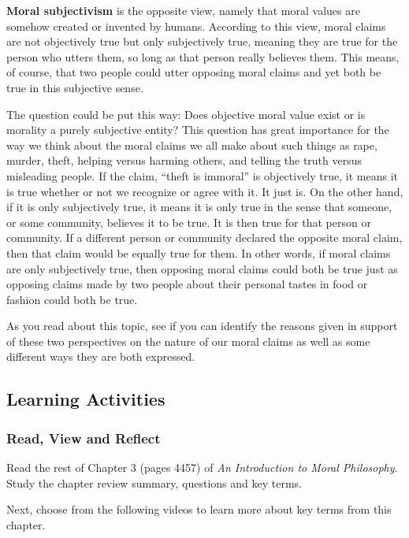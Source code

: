 \documentclass[
]{book}
\begin{document}
\textbf{Moral subjectivism} is the opposite view, namely that moral values are somehow created or invented by humans. According to this view, moral claims are not objectively true but only subjectively true, meaning they are true for the person who utters them, so long as that person really believes them. This means, of course, that two people could utter opposing moral claims and yet both be true in this subjective sense.

The question could be put this way: Does objective moral value exist or is morality a purely subjective entity? This question has great importance for the way we think about the moral claims we all make about such things as rape, murder, theft, helping versus harming others, and telling the truth versus misleading people. If the claim, ``theft is immoral'' is objectively true, it means it is true whether or not we recognize or agree with it. It just is. On the other hand, if it is only subjectively true, it means it is only true in the sense that someone, or some community, believes it to be true. It is then true for that person or community. If a different person or community declared the opposite moral claim, then that claim would be equally true for them. In other words, if moral claims are only subjectively true, then opposing moral claims could both be true just as opposing claims made by two people about their personal tastes in food or fashion could both be true.

As you read about this topic, see if you can identify the reasons given in support
of these two perspectives on the nature of our moral claims as well as some
different ways they are both expressed.

\hypertarget{learning-activities-4}{%
\subsection*{Learning Activities}\label{learning-activities-4}}

\begin{reflect}
\hypertarget{read-view-and-reflect-4}{%
\subsubsection*{Read, View and Reflect}\label{read-view-and-reflect-4}}

Read the rest of Chapter 3 (pages 4457) of \emph{An Introduction to Moral
Philosophy}. Study the chapter review summary, questions and key terms.

Next, choose from the following videos to learn more about key terms from this
chapter.
\end{reflect}
\end{document}

